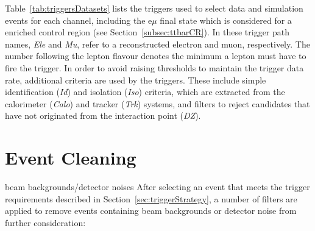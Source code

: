 Table~\ref{tab:triggersDatasets} lists the triggers used to select data and simulation events for each channel, including the e$\mu$ final state which is considered for a \ttbar enriched control region (see Section~\ref{subsec:ttbarCR}).
In these trigger path names, \emph{Ele} and \emph{Mu}, refer to a reconstructed electron and muon, respectively.
The number following the lepton flavour denotes the minimum \pT a lepton must have to fire the trigger.
In order to avoid raising \pT thresholds to maintain the trigger data rate, additional criteria are used by the triggers.
These include simple identification (\emph{Id}) and isolation (\emph{Iso}) criteria, which are extracted from the calorimeter (\emph{Calo}) and tracker (\emph{Trk}) systems, and filters to reject candidates that have not originated from the interaction point (\emph{DZ}).

\begin{table}[h]
\label{tab:triggersDatasets}
  \centering
\end{table}


\section{Event Cleaning}\label{sec:metFilters}
beam backgrounds/detector noises
After selecting an event that meets the trigger requirements described in Section~\ref{sec:triggerStrategy}, a number of filters are applied to remove events containing beam backgrounds or detector noise from further consideration:

